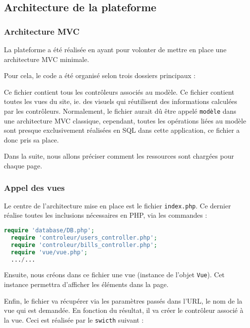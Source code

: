 \subsection{Architecture de la plateforme}

\subsubsection{Architecture MVC}
La plateforme a été réalisée en ayant pour volonter de mettre en place une architecture MVC minimale.

Pour cela, le code a été organisé selon trois dossiers principaux :
\begin{itemize}
  Ce fichier contient tous les contrôleurs associés au modèle.
  Ce fichier contient toutes les vues du site, ie. des visuels qui réutilisent des informations calculées par les contrôleurs.
  Normalement, le fichier aurait dû être appelé \texttt{modèle} dans une architecture MVC classique, cependant, toutes les opérations liées au modèle sont presque exclusivement réalisées en SQL dans cette application, ce fichier a donc \og pris sa place\fg.
\end{itemize}
Dans la suite, nous allons préciser comment les ressources sont chargées pour chaque page.

\subsubsection{Appel des vues}
Le centre de l'architecture mise en place est le fichier \texttt{index.php}. Ce dernier réalise toutes les inclusions nécessaires en PHP, via les commandes :

\begin{lstlisting}[language=php]
  require 'database/DB.php';
  require 'controleur/users_controller.php';
  require 'controleur/bills_controller.php';
  require 'vue/vue.php';
  .../...
\end{lstlisting}

Ensuite, nous créons dans ce fichier une vue (instance de l'objet \texttt{Vue}). Cet instance permettra d'afficher les éléments dans la page.

Enfin, le fichier va récupérer via les paramètres passés dans l'URL, le nom de la vue qui est demandée. En fonction du résultat, il va créer le contrôleur associé à la vue. Ceci est réalisée par le \texttt{swicth} suivant :

